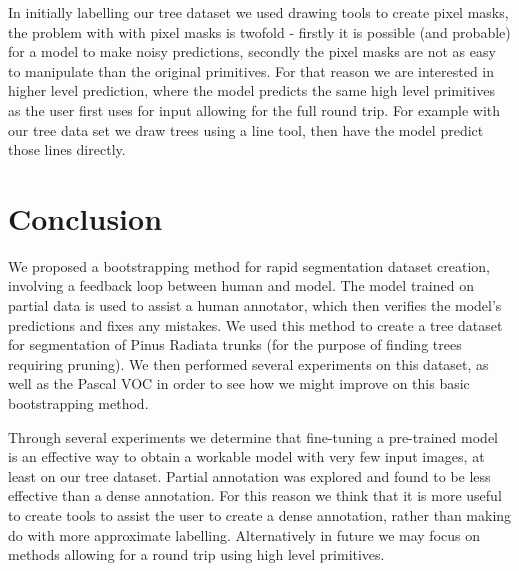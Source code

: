 In initially labelling our tree dataset we used drawing tools to create pixel masks, the problem with with pixel masks is twofold - firstly it is possible (and probable) for a model to make noisy predictions, secondly the pixel masks are not as easy to manipulate than the original primitives. For that reason we are interested in higher level prediction, where the model predicts the same high level primitives as the user first uses for input allowing for the full round trip. For example with our tree data set we draw trees using a line tool, then have the model predict those lines directly.


\section {Conclusion}

We proposed a bootstrapping method for rapid segmentation dataset creation, involving a feedback loop between human and model. The model trained on partial data is used to assist a human annotator, which then verifies the model's predictions and fixes any mistakes. We used this method to create a tree dataset for segmentation of Pinus Radiata trunks (for the purpose of finding trees requiring pruning). We then performed several experiments on this dataset, as well as the Pascal VOC in order to see how we might improve on this basic bootstrapping method. 

Through several experiments we determine that fine-tuning a pre-trained model is an effective way to obtain a workable model with very few input images, at least on our tree dataset. Partial annotation was explored and found to be less effective than a dense annotation. For this reason we think that it is more useful to create tools to assist the user to create a dense annotation, rather than making do with more approximate labelling. Alternatively in future we may focus on methods allowing for a round trip using high level primitives.



